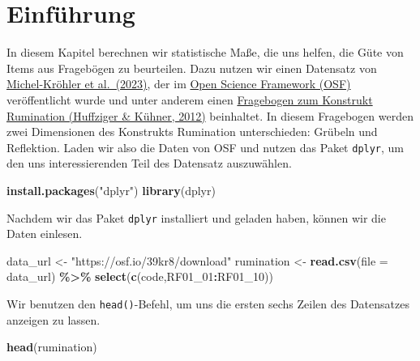 \documentclass[
  ngerman,
]{book}
\newenvironment{Shaded}{\begin{snugshade}}{\end{snugshade}}
\newcommand{\AttributeTok}[1]{\textcolor[rgb]{0.13,0.29,0.53}{#1}}
\newcommand{\FunctionTok}[1]{\textcolor[rgb]{0.13,0.29,0.53}{\textbf{#1}}}
\newcommand{\NormalTok}[1]{#1}
\newcommand{\OtherTok}[1]{\textcolor[rgb]{0.56,0.35,0.01}{#1}}
\newcommand{\SpecialCharTok}[1]{\textcolor[rgb]{0.81,0.36,0.00}{\textbf{#1}}}
\newcommand{\StringTok}[1]{\textcolor[rgb]{0.31,0.60,0.02}{#1}}
\begin{document}
\section{Einführung}\label{einfuxfchrung-2}

In diesem Kapitel berechnen wir statistische Maße, die uns helfen, die Güte von Items aus Fragebögen zu beurteilen. Dazu nutzen wir einen Datensatz von \href{https://doi.org/10.1371/journal.pone.0288450}{Michel-Kröhler et al.~(2023)}, der im \href{https://osf.io/gqvb9/}{Open Science Framework (OSF)} veröffentlicht wurde und unter anderem einen \href{https://econtent.hogrefe.com/doi/10.1026/1616-3443/a000118}{Fragebogen zum Konstrukt Rumination (Huffziger \& Kühner, 2012)} beinhaltet. In diesem Fragebogen werden zwei Dimensionen des Konstrukts Rumination unterschieden: Grübeln und Reflektion. Laden wir also die Daten von OSF und nutzen das Paket \texttt{dplyr}, um den uns interessierenden Teil des Datensatz auszuwählen.

\begin{Shaded}
\begin{Highlighting}[]
\FunctionTok{install.packages}\NormalTok{(}\StringTok{"dplyr"}\NormalTok{)}
\FunctionTok{library}\NormalTok{(dplyr)}
\end{Highlighting}
\end{Shaded}

Nachdem wir das Paket \texttt{dplyr} installiert und geladen haben, können wir die Daten einlesen.

\begin{Shaded}
\begin{Highlighting}[]
\NormalTok{data\_url }\OtherTok{\textless{}{-}} \StringTok{"https://osf.io/39kr8/download"}
\NormalTok{rumination }\OtherTok{\textless{}{-}} \FunctionTok{read.csv}\NormalTok{(}\AttributeTok{file =}\NormalTok{ data\_url) }\SpecialCharTok{\%\textgreater{}\%}
  \FunctionTok{select}\NormalTok{(}\FunctionTok{c}\NormalTok{(code,RF01\_01}\SpecialCharTok{:}\NormalTok{RF01\_10))}
\end{Highlighting}
\end{Shaded}

Wir benutzen den \texttt{head()}-Befehl, um uns die ersten sechs Zeilen des Datensatzes anzeigen zu lassen.

\begin{Shaded}
\begin{Highlighting}[]
\FunctionTok{head}\NormalTok{(rumination)}
\end{Highlighting}
\end{Shaded}
\end{document}
